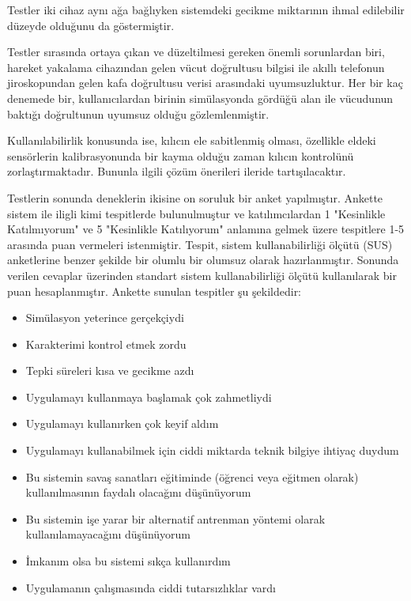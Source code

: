 \documentclass[a4paper, 12pt, titlepage]{article}
\begin{document}
Testler iki cihaz aynı ağa bağlıyken sistemdeki gecikme miktarının ihmal edilebilir düzeyde olduğunu
da göstermiştir.

Testler sırasında ortaya çıkan ve düzeltilmesi gereken önemli sorunlardan biri, hareket yakalama
cihazından gelen vücut doğrultusu bilgisi ile akıllı telefonun jiroskopundan gelen kafa doğrultusu
verisi arasındaki uyumsuzluktur. Her bir kaç denemede bir, kullanıcılardan birinin simülasyonda gördüğü
alan ile vücudunun baktığı doğrultunun uyumsuz olduğu gözlemlenmiştir.

Kullanılabilirlik konusunda ise, kılıcın ele sabitlenmiş olması,
özellikle eldeki sensörlerin kalibrasyonunda bir kayma olduğu zaman kılıcın kontrolünü
zorlaştırmaktadır. Bununla ilgili çözüm önerileri ileride tartışılacaktır.

Testlerin sonunda deneklerin ikisine on soruluk bir anket yapılmıştır. Ankette sistem ile iligli kimi
tespitlerde bulunulmuştur ve katılımcılardan 1 "Kesinlikle Katılmıyorum" ve 5 "Kesinlikle Katılıyorum"
anlamına gelmek üzere tespitlere 1-5 arasında puan vermeleri istenmiştir. Tespit, sistem
kullanabilirliği ölçütü (SUS) anketlerine benzer şekilde bir olumlu bir olumsuz olarak hazırlanmıştır.
Sonunda verilen cevaplar üzerinden standart sistem kullanabilirliği ölçütü kullanılarak bir puan
hesaplanmıştır. Ankette sunulan tespitler şu şekildedir:

\begin{itemize}
    \item Simülasyon yeterince gerçekçiydi
    \item Karakterimi kontrol etmek zordu
    \item Tepki süreleri kısa ve gecikme azdı
    \item Uygulamayı kullanmaya başlamak çok zahmetliydi
    \item Uygulamayı kullanırken çok keyif aldım
    \item Uygulamayı kullanabilmek için ciddi miktarda teknik bilgiye ihtiyaç duydum
    \item Bu sistemin savaş sanatları eğitiminde (öğrenci veya eğitmen olarak) kullanılmasının faydalı olacağını düşünüyorum
    \item Bu sistemin işe yarar bir alternatif antrenman yöntemi olarak kullanılamayacağını düşünüyorum
    \item İmkanım olsa bu sistemi sıkça kullanırdım
    \item Uygulamanın çalışmasında ciddi tutarsızlıklar vardı
\end{itemize}
\end{document}
